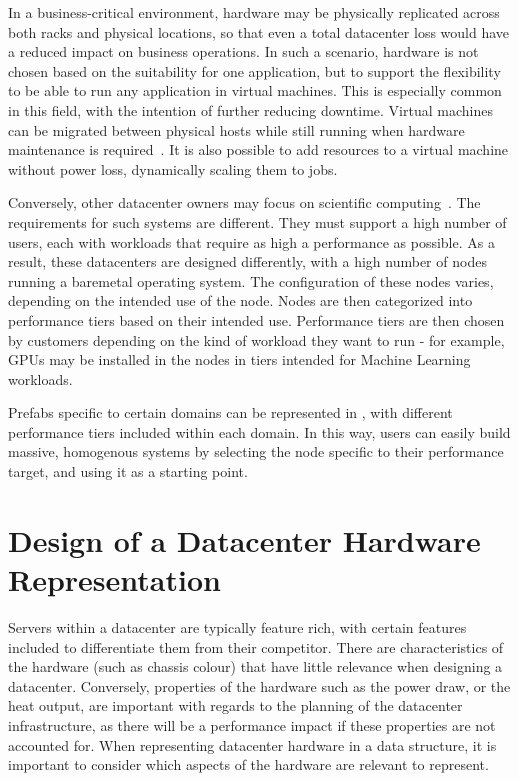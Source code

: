 \documentclass[11pt]{article}
\begin{document}
		In a business-critical environment, hardware may be physically replicated across both racks and physical locations, so that even a total datacenter loss would have a reduced impact on business operations.
		In such a scenario, hardware is not chosen based on the suitability for one application, but to support the flexibility to be able to run any application in virtual machines.
		This is especially common in this field, with the intention of further reducing downtime.
		Virtual machines can be migrated between physical hosts while still running when hardware maintenance is required~\cite{Elsaid2016}.
		It is also possible to add resources to a virtual machine without power loss, dynamically scaling them to jobs.

		Conversely, other datacenter owners may focus on scientific computing~\cite{SURF2020}.
		The requirements for such systems are different.
		They must support a high number of users, each with workloads that require as high a performance as possible.
		As a result, these datacenters are designed differently, with a high number of nodes running a baremetal operating system.
		The configuration of these nodes varies, depending on the intended use of the node.
		Nodes are then categorized into performance tiers based on their intended use.
		Performance tiers are then chosen by customers depending on the kind of workload they want to run - for example, GPUs may be installed in the nodes in tiers intended for Machine Learning workloads.

		Prefabs specific to certain domains can be represented in \opendc{}, with different performance tiers included within each domain.
		In this way, users can easily build massive, homogenous systems by selecting the node specific to their performance target, and using it as a starting point.

\newpage

\section{Design of a Datacenter Hardware Representation} \label{sec:design}
	Servers within a datacenter are typically feature rich, with certain features included to differentiate them from their competitor.
	There are characteristics of the hardware (such as chassis colour) that have little relevance when designing a datacenter.
	Conversely, properties of the hardware such as the power draw, or the heat output, are important with regards to the planning of the datacenter infrastructure, as there will be a performance impact if these properties are not accounted for.
	When representing datacenter hardware in a data structure, it is important to consider which aspects of the hardware are relevant to represent.
	
\end{document}
